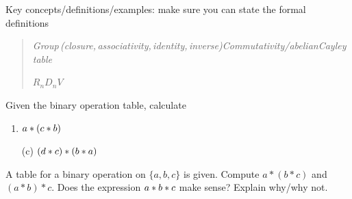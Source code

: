 \begin{exercises}
	Key concepts/definitions/examples: make sure you can state the formal definitions
	\begin{quote}
		\emph{Group\,(closure,\,associativity,\,identity,\,inverse)\qquad Commutativity/abelian\qquad Cayley table}\par
		$R_n$\qquad $D_n$\qquad $V$\qquad {}
	\end{quote}


	\begin{enumerate}
	  \begin{minipage}[t]{0.72\linewidth}\vspace{-5pt}
			\item Given the binary operation table, calculate
			\begin{enumerate}\itemsep0pt
				\item {} $a\mathbin{\ast} (c\mathbin{\ast} b)$
				\item[(c)]  $(d\mathbin{\ast} c)\mathbin{\ast} (b\mathbin{\ast} a)$
			\end{enumerate}
		\end{minipage}
		\hfill
		\begin{minipage}[t]{0.2\linewidth}\vspace{-5pt}
			\flushright {}
		\end{minipage}
		\smallbreak
	
	
		\begin{minipage}[t]{0.72\linewidth}\vspace{0pt}
			\item A table for a binary operation on $\{a,b,c\}$ is given. Compute $a*(b*c)$ and $(a*b)*c$. Does the expression $a\mathbin{\ast} b\mathbin{\ast} c$ make sense? Explain why/why not.
			\end{minipage}
			\hfill
			\begin{minipage}[t]{0.2\linewidth}\vspace{0pt}
				\flushright{}
		\end{minipage}
		\par
	

\end{enumerate}
\end{exercises}
